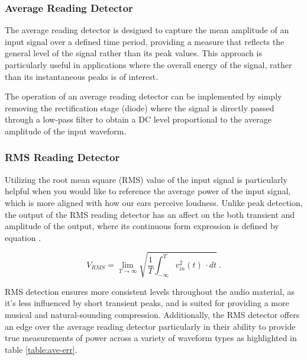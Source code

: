 \documentclass[10pt]{article}
\begin{document}
\begin{multicols*}{2}
                \subsubsection{Average Reading Detector}
                    The average reading detector is designed to capture the mean amplitude of an input signal over a defined time period, providing a measure that reflects the general level of the signal rather than its peak values. This approach is particularly useful in applications where the overall energy of the signal, rather than its instantaneous peaks is of interest.\par
                    The operation of an average reading detector can be implemented by simply removing the rectification stage (diode) where the signal is directly passed through a low-pass filter to obtain a DC level proportional to the average amplitude of the input waveform. 
                

                    

                \subsubsection{RMS Reading Detector}
                    Utilizing the root mean square (RMS) value of the input signal is particularly helpful when you would like to reference the average power of the input signal, which is more aligned with how our ears perceive loudness. Unlike peak detection, the output of the RMS reading detector has an affect on the both transient and amplitude of the output, where its continuous form expression is defined by equation \cite{aes-that-rms}.
                    
                        \begin{equation}
                            V_{RMS} = \lim_{T \to \infty}\sqrt{\frac{1}{T}\int_{-\infty}^{T} v_{in}^2(t) \,\cdot dt}\ .
                        \end{equation}
                    
                    \noindent RMS detection ensures more consistent levels throughout the audio material, as it's less influenced by short transient peaks, and is suited for providing a more musical and natural-sounding compression. Additionally, the RMS detector offers an edge over the average reading detector particularly in their ability to provide true measurements of power across a variety of waveform types as highlighted in table \ref{table:ave-err}.   


\end{multicols*}
\end{document}
